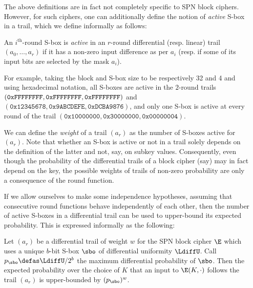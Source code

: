 \medskip

The above definitions are in fact not completely specific to SPN block ciphers. However, for such ciphers, one can additionally
define the notion of \emph{active} S-box in a trail, which we define informally as follows:

\begin{defi}
An $i^\text{th}$-round S-box is \emph{active} in an $r$-round differential (resp. linear) trail $(a_0,\ldots,a_r)$
if it has a non-zero input difference as per $a_i$ (resp. if some of its input bits are selected
by the mask $a_i$).
\end{defi}

\noindent
For example, taking the block and S-box size to be respectively 32 and 4 and using hexadecimal notation, all S-boxes are active in the
$2$-round trails $(\texttt{0xFFFFFFFF}, \texttt{0xFFFF}\linebreak{}\texttt{FFFF}, \texttt{0xFFFFFFFF})$ and
$(\texttt{0x12345678}, \texttt{0x9ABCDEFE}, \texttt{0xDCBA9876})$, and only one S-box is active at every round of the trail $(\texttt{0x10000000},
\texttt{0x30000000}, \texttt{0x00000004})$.

We can define the \emph{weight} of a trail $(a_r)$ as the number of S-boxes active for $(a_r)$. Note that whether
an S-box is active or not in a trail solely depends on the definition of the latter and not, say, on subkey values.
Consequently, even though the probability of the differential trails of a block cipher (say) may in fact depend on the key, the possible weights of
trails of non-zero probability are only a consequence of the round function.

If we allow ourselves to make some independence hypotheses, assuming that consecutive round functions
behave independently of each other, then the number of active S-boxes in a differential trail can be used to upper-bound its expected probability.
This is expressed informally as the following:

\begin{assu}
\label{assu:mark}
Let $(a_r)$ be a differential trail of weight $w$ for the SPN block cipher $\E$ which uses a unique $b$-bit S-box $\sbo$ of differential uniformity
$\LdiffU$. Call $p_{\sbo} \defas \LdiffU/2^b$ the maximum differential probability of $\sbo$.
Then the expected probability over the choice of $K$ that an input to $\E(K,\cdot)$ follows the trail $(a_r)$ is upper-bounded by $(p_{\sbo})^w$.
\end{assu}

